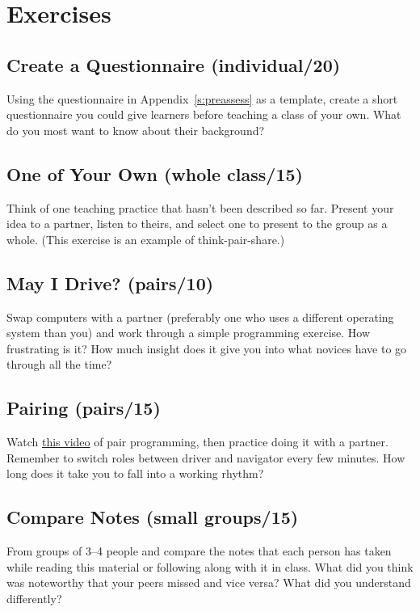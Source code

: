 \section{Exercises}\label{s:classroom-exercises}

\subsection*{Create a Questionnaire (individual/20)}

Using the questionnaire in Appendix~\ref{s:preassess} as a template,
create a short questionnaire you could give learners before teaching a
class of your own. What do you most want to know about their background?

\subsection*{One of Your Own (whole class/15)}

Think of one teaching practice that hasn't been described so far.
Present your idea to a partner, listen to theirs, and select one to
present to the group as a whole. (This exercise is an example of
think-pair-share.)

\subsection*{May I Drive? (pairs/10)}

Swap computers with a partner (preferably one who uses a different
operating system than you) and work through a simple programming
exercise. How frustrating is it? How much insight does it give you into
what novices have to go through all the time?

\subsection*{Pairing (pairs/15)}

Watch \href{https://www.youtube.com/watch?v=vgkahOzFH2Q}{this video} of pair programming, then
practice doing it with a partner. Remember to switch roles between
driver and navigator every few minutes. How long does it take you to
fall into a working rhythm?

\subsection*{Compare Notes (small groups/15)}

From groups of 3--4 people and compare the notes that each person has
taken while reading this material or following along with it in class.
What did you think was noteworthy that your peers missed and vice versa?
What did you understand differently?

